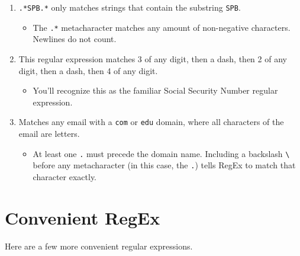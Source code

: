 \documentclass[
  letterpaper,
  DIV=11,
  numbers=noendperiod]{scrreprt}
\providecommand{\tightlist}{%
  \setlength{\itemsep}{0pt}\setlength{\parskip}{0pt}}\usepackage{longtable,booktabs,array}
\begin{document}
\begin{enumerate}
\def\labelenumi{\arabic{enumi}.}
\tightlist
\item
  \texttt{.*SPB.*} only matches strings that contain the substring
  \texttt{SPB}.

  \begin{itemize}
  \tightlist
  \item
    The \texttt{.*} metacharacter matches any amount of non-negative
    characters. Newlines do not count.\\
  \end{itemize}
\item
  This regular expression matches 3 of any digit, then a dash, then 2 of
  any digit, then a dash, then 4 of any digit.

  \begin{itemize}
  \tightlist
  \item
    You'll recognize this as the familiar Social Security Number regular
    expression.
  \end{itemize}
\item
  Matches any email with a \texttt{com} or \texttt{edu} domain, where
  all characters of the email are letters.

  \begin{itemize}
  \tightlist
  \item
    At least one \texttt{.} must precede the domain name. Including a
    backslash \texttt{\textbackslash{}} before any metacharacter (in
    this case, the \texttt{.}) tells RegEx to match that character
    exactly.
  \end{itemize}
\end{enumerate}

\section{Convenient RegEx}\label{convenient-regex}

Here are a few more convenient regular expressions.
\end{document}
